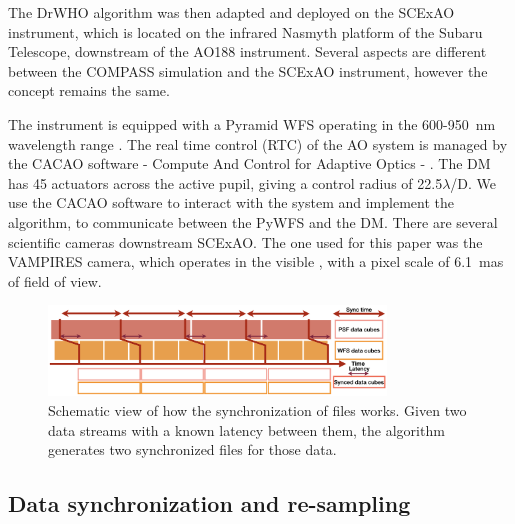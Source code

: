 \documentclass[twocolumn]{aa}
\begin{document}
The DrWHO algorithm was then adapted and deployed on the SCExAO instrument, which is located on the infrared Nasmyth platform of the Subaru Telescope, downstream of the AO188 instrument. Several aspects are different between the COMPASS simulation and the SCExAO instrument, however the concept remains the same.

The instrument is equipped with a Pyramid WFS operating in the 600-950~nm wavelength range \citep{Lozi2019PWFS}. The real time control (RTC) of the AO system is managed by the CACAO software - Compute And Control for Adaptive Optics - \citep{cacao2018}. The DM has 45 actuators across the active pupil, giving a control radius of 22.5$\lambda$/D. We use the CACAO software to interact with the system and implement the algorithm, to communicate between the PyWFS and the DM.
There are several scientific cameras downstream SCExAO. The one used for this paper was the VAMPIRES camera, which operates in the visible \citep{vampires2015}, with a pixel scale of 6.1~mas of field of view. 

\begin{figure}[t]
\begin{center}
\centering
\includegraphics[width=0.8\textwidth]{fig/sync_image.png}
\caption{Schematic view of how the synchronization of files works. Given two data streams with a known latency between them, the algorithm generates two synchronized files for those data.}
\label{fig:sync_files}
\end{center}
\end{figure}

\subsection{Data synchronization and re-sampling}\label{sec:syncdata}
\end{document}
